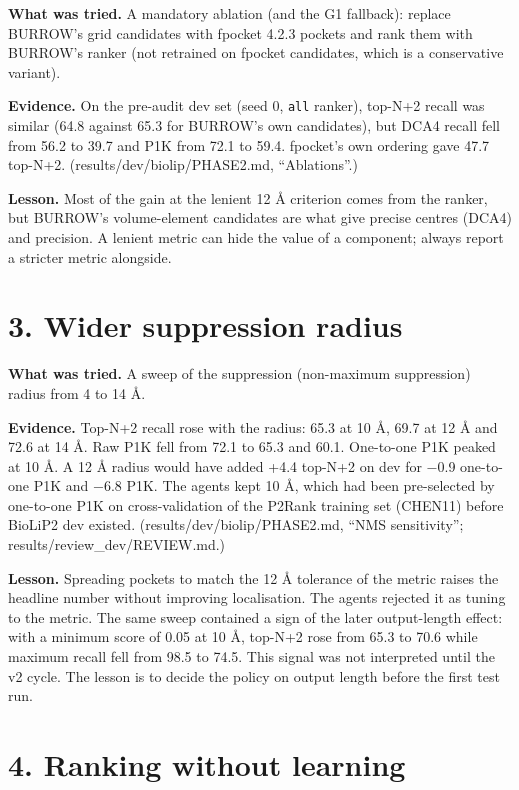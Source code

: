 \documentclass[10pt,letterpaper]{article}
\begin{document}
\textbf{What was tried.} A mandatory ablation (and the G1 fallback): replace BURROW's grid candidates with fpocket 4.2.3 pockets and rank them with BURROW's ranker (not retrained on fpocket candidates, which is a conservative variant).

\textbf{Evidence.} On the pre-audit dev set (seed 0, \texttt{all} ranker), top-N+2 recall was similar (64.8 against 65.3 for BURROW's own candidates), but DCA4 recall fell from 56.2 to 39.7 and P1K from 72.1 to 59.4. fpocket's own ordering gave 47.7 top-N+2. (results/dev/biolip/PHASE2.md, ``Ablations''.)

\textbf{Lesson.} Most of the gain at the lenient 12 \AA{} criterion comes from the ranker, but BURROW's volume-element candidates are what give precise centres (DCA4) and precision. A lenient metric can hide the value of a component; always report a stricter metric alongside.

\section*{3. Wider suppression radius}

\textbf{What was tried.} A sweep of the suppression (non-maximum suppression) radius from 4 to 14 \AA{}.

\textbf{Evidence.} Top-N+2 recall rose with the radius: 65.3 at 10 \AA{}, 69.7 at 12 \AA{} and 72.6 at 14 \AA{}. Raw P1K fell from 72.1 to 65.3 and 60.1. One-to-one P1K peaked at 10 \AA{}. A 12 \AA{} radius would have added +4.4 top-N+2 on dev for $-$0.9 one-to-one P1K and $-$6.8 P1K. The agents kept 10 \AA{}, which had been pre-selected by one-to-one P1K on cross-validation of the P2Rank training set (CHEN11) before BioLiP2 dev existed. (results/dev/biolip/PHASE2.md, ``NMS sensitivity''; results/review\_dev/REVIEW.md.)

\textbf{Lesson.} Spreading pockets to match the 12 \AA{} tolerance of the metric raises the headline number without improving localisation. The agents rejected it as tuning to the metric. The same sweep contained a sign of the later output-length effect: with a minimum score of 0.05 at 10 \AA{}, top-N+2 rose from 65.3 to 70.6 while maximum recall fell from 98.5 to 74.5. This signal was not interpreted until the v2 cycle. The lesson is to decide the policy on output length before the first test run.

\section*{4. Ranking without learning}
\end{document}
